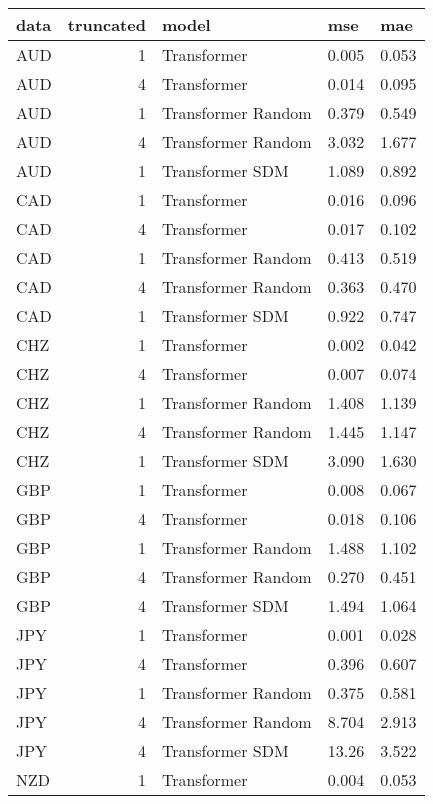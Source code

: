 \begin{tabular}{lrlll}
\toprule
data &  truncated &             model &   mse &   mae \\
\midrule
 AUD &          1 & Transformer & 0.005 & 0.053 \\
 AUD &          4 & Transformer & 0.014 & 0.095 \\
 AUD &          1 &    Transformer Random & 0.379 & 0.549 \\
 AUD &          4 &    Transformer Random & 3.032 & 1.677 \\
 AUD &          1 &    Transformer SDM & 1.089 & 0.892 \\
 CAD &          1 & Transformer & 0.016 & 0.096 \\
 CAD &          4 & Transformer & 0.017 & 0.102 \\
 CAD &          1 &    Transformer Random & 0.413 & 0.519 \\
 CAD &          4 &    Transformer Random & 0.363 & 0.470 \\
 CAD &          1 &    Transformer SDM & 0.922 & 0.747 \\
 CHZ &          1 & Transformer & 0.002 & 0.042 \\
 CHZ &          4 & Transformer & 0.007 & 0.074 \\
 CHZ &          1 &    Transformer Random & 1.408 & 1.139 \\
 CHZ &          4 &    Transformer Random & 1.445 & 1.147 \\
 CHZ &          1 &    Transformer SDM & 3.090 & 1.630 \\
 GBP &          1 & Transformer & 0.008 & 0.067 \\
 GBP &          4 & Transformer & 0.018 & 0.106 \\
 GBP &          1 &    Transformer Random & 1.488 & 1.102 \\
 GBP &          4 &    Transformer Random & 0.270 & 0.451 \\
 GBP &          4 &    Transformer SDM & 1.494 & 1.064 \\
 JPY &          1 & Transformer & 0.001 & 0.028 \\
 JPY &          4 & Transformer & 0.396 & 0.607 \\
 JPY &          1 &    Transformer Random & 0.375 & 0.581 \\
 JPY &          4 &    Transformer Random & 8.704 & 2.913 \\
 JPY &          4 &    Transformer SDM & 13.26 & 3.522 \\
 NZD &          1 & Transformer & 0.004 & 0.053 \\

\end{tabular}
